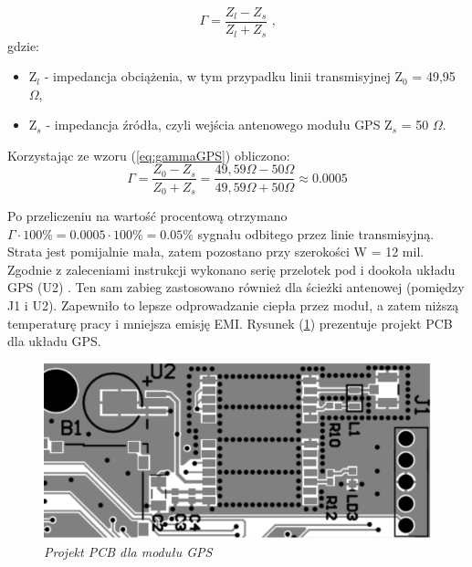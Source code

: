 \documentclass[eng,printmode]{mgr}
\begin{document}
\begin{equation}
\Gamma= \frac{Z_l - Z_s}{Z_l + Z_s} \textrm{ ,} \label{eq:gammaGPS} 
\end{equation}
gdzie:
\begin{itemize}
  \item Z$_l$ - impedancja obciążenia, w tym przypadku linii transmisyjnej Z$_0$ = 49,95 $ \Omega$,
  \item Z$_s$ - impedancja źródła, czyli wejścia antenowego modułu GPS Z$_s$ = 50 $\Omega$.
\end{itemize}
\noindent
Korzystając ze wzoru (\ref{eq:gammaGPS}) obliczono:
\begin{equation}
\Gamma= \frac{Z_0 - Z_s}{Z_0 + Z_s} = \frac{49,59\Omega -50\Omega}{49,59\Omega  + 50\Omega } \approx 0.0005 
\end{equation}

Po przeliczeniu na wartość procentową otrzymano $\Gamma \cdot 100\% = 0.0005 \cdot 100\% = 0.05\%$ sygnału odbitego przez linie transmisyjną. Strata jest pomijalnie mała, zatem pozostano przy szerokości W = 12 mil.\\

Zgodnie z zaleceniami instrukcji wykonano serię przelotek pod i dookoła układu GPS (U2)  \cite{gpsHW}. Ten sam zabieg zastosowano również dla ścieżki antenowej (pomiędzy J1 i U2). Zapewniło to lepsze odprowadzanie ciepła przez moduł, a zatem niższą temperaturę pracy i mniejsza emisję EMI. Rysunek (\ref{fig:gpsPCB}) prezentuje projekt PCB dla układu GPS.
\begin{figure}[!h]
    \centering
    \includegraphics[width=15cm]{pcb/gps.png}
    \caption{\textit{Projekt PCB dla modułu GPS}}
    \label{fig:gpsPCB}
\end{figure}
\end{document}
